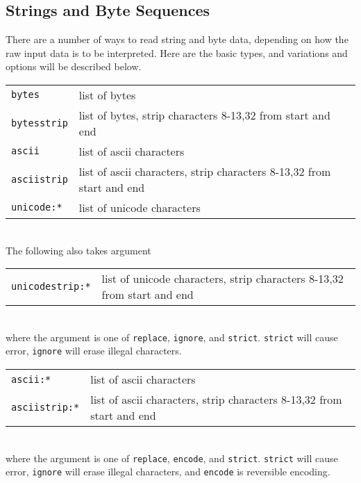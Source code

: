 \subsection{Strings and Byte Sequences}
There are a number of ways to read string and byte data, depending on
how the raw input data is to be interpreted.  Here are the basic
types, and variations and options will be described below.\\

\begin{tabular}{ll}
  \texttt{bytes}      & list of bytes\\
  \texttt{bytesstrip} & list of bytes, strip characters 8-13,32 from start and end\\
  \texttt{ascii}      & list of ascii characters\\
  \texttt{asciistrip} & list of ascii characters, strip characters 8-13,32 from start and end\\
  \texttt{unicode:*}    & list of unicode characters\\
\end{tabular}\\

\noindent The following also takes argument\\

\begin{tabular}{ll}
  \texttt{unicodestrip:*}  & list of unicode characters, strip characters 8-13,32 from start and end\\
\end{tabular}\\

\noindent where the argument is one of \texttt{replace}, \texttt{ignore}, and \texttt{strict}.
\texttt{strict} will cause error, \texttt{ignore} will erase illegal characters.\\

\begin{tabular}{ll}
  \texttt{ascii:*}      & list of ascii characters\\
  \texttt{asciistrip:*} & list of ascii characters, strip characters 8-13,32 from start and end\\
\end{tabular}\\

\noindent where the argument is one of \texttt{replace}, \texttt{encode}, and \texttt{strict}.
\texttt{strict} will cause error, \texttt{ignore} will erase illegal characters,
and \texttt{encode} is reversible encoding.


